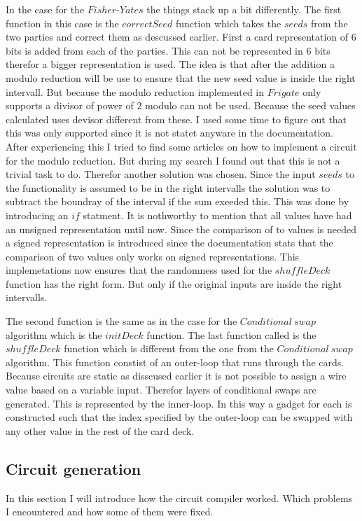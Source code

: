 In the case for the $Fisher\text{-}Yates$ the things stack up a bit differently. The first function in this case is the $correctSeed$ function which takes the $seeds$ from the two parties and correct them as descussed earlier. First a card representation of $6$ bits is added from each of the parties. This can not be represented in $6$ bits therefor a bigger representation is used. The idea is that after the addition a modulo reduction will be use to ensure that the new seed value is inside the right intervall. But because the modulo reduction implemented in $Frigate$ only supports a divisor of power of $2$ modulo can not be used. Because the seed values calculated uses devisor different from these. I used some time to figure out that this was only supported since it is not statet anyware in the documentation. After experiencing this I tried to find some articles on how to implement a circuit for the modulo reduction. But during my search I found out that this is not a trivial task to do. Therefor another solution was chosen. Since the input $seeds$ to the functionality is assumed to be in the right intervalls the solution was to subtract the boundray of the interval if the sum exeeded this. This was done by introducing an $if$ statment. It is nothworthy to mention that all values have had an unsigned representation until now. Since the comparison of to values is needed a signed representation is introduced since the documentation stats that the comparison of two values only works on signed representations. This implemetations now ensures that the randomness used for the $shuffleDeck$ function has the right form. But only if the original inputs are inside the right intervalls.

The second function is the same as in the case for the $Conditional~swap$ algorithm which is the $initDeck$ function. The last function called is the $shuffleDeck$ function which is different from the one from the $Conditional~swap$ algorithm. This function constist of an outer-loop that runs through the cards. Because circuits are static as disscused earlier it is not possible to assign a wire value based on a variable input. Therefor layers of conditional swaps are generated. This is represented by the inner-loop. In this way a gadget for each is constructed such that the index specified by the outer-loop can be swapped with any other value in the rest of the card deck.


\subsection{Circuit generation}
In this section I will introduce how the circuit compiler worked. Which problems I encountered and how some of them were fixed. 


